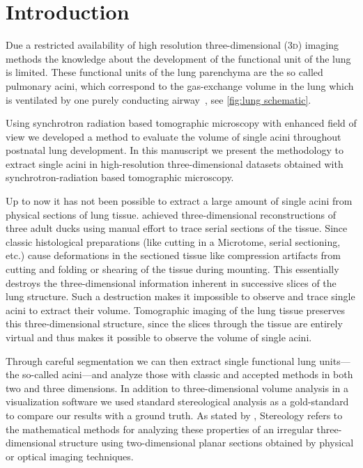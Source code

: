 \documentclass[%
	paper=a4,%
	abstract=true,%
	]{scrartcl}
\newcommand{\threed}{3\textsc{d}\xspace}
\begin{document}
\clearpage
\tableofcontents

\clearpage
\section{Introduction}\label{sec:Introduction}
Due a restricted availability of high resolution three-dimensional (\threed) imaging methods the knowledge about the development of the functional unit of the lung is limited. These functional units of the lung parenchyma are the so called pulmonary acini, which correspond to the gas-exchange volume in the lung which is ventilated by one purely conducting airway~\cite{Rodriguez1987}, see \autoref{fig:lung schematic}.

Using synchrotron radiation based tomographic microscopy with enhanced field of view \cite{Haberthuer2010a} we developed a method to evaluate the volume of single acini throughout postnatal lung development. In this manuscript we present the methodology to extract single acini in high-resolution three-dimensional datasets obtained with synchrotron-radiation based tomographic microscopy.

Up to now it has not been possible to extract a large amount of single acini from physical sections of lung tissue. \citet{Woodward2005} achieved three-dimensional reconstructions of three adult ducks using manual effort to trace serial sections of the tissue. Since classic histological preparations (like cutting in a Microtome, serial sectioning, etc.) cause deformations in the sectioned tissue like compression artifacts from cutting and folding or shearing of the tissue during mounting. This essentially destroys the three-dimensional information inherent in successive slices of the lung structure. Such a destruction makes it impossible to observe and trace single acini to extract their volume. Tomographic imaging of the lung tissue preserves this three-dimensional structure, since the slices through the tissue are entirely virtual and thus makes it possible to observe the volume of single acini.

Through careful segmentation we can then extract single functional lung units---the so-called acini---and analyze those with classic and accepted methods in both two and three dimensions. In addition to three-dimensional volume analysis in a visualization software we used standard stereological analysis \cite{Hsia2010} as a gold-standard to compare our results with a ground truth. As stated by \citet{Hsia2010}, Stereology refers to the mathematical methods for analyzing these properties of an irregular three-dimensional structure using two-dimensional planar sections obtained by physical or optical imaging techniques.
\end{document}
